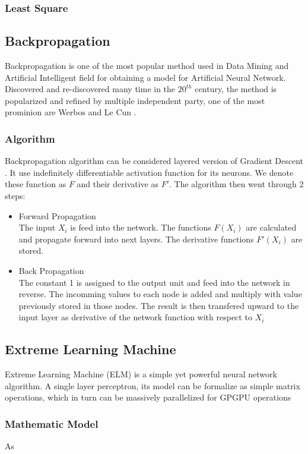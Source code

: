 \documentclass[11pt]{article}
\begin{document}
\subsubsection{Least Square}

\subsection{Backpropagation}
Backpropagation is one of the most popular method used in Data Mining and Artificial Intelligent field for obtaining a model for Artificial Neural Network. Discovered and re-discovered many time in the $20^{th}$ century, the method is popularized and refined by multiple independent party, one of the most prominion are Werbos and Le Cun \cite{lecun_theoretical_1992}.
\subsubsection{Algorithm}
Backpropagation algorithm can be considered layered version of Gradient Descent \cite{bishop_pattern_2006}. It use indefinitely differentiable activation function for its neurons. We denote these function as $F$ and their derivative as $F'$. The algorithm then went through 2 steps: \cite[161]{rojas_neural_1996}
\begin{itemize}
\item Forward Propagation\\
The input $X_i$ is feed into the network. The functions $F(X_i)$ are calculated and propagate forward into next layers. The derivative functions $F'(X_i)$ are stored.
\item Back Propagation\\
The constant 1 is assigned to the output unit and feed into the network in reverse. The incomming values to each node is added and multiply with value previously stored in those nodes. The result is then transfered upward to the input layer as derivative of the network function with respect to $X_i$
\end{itemize}
\subsection{Extreme Learning Machine}
Extreme Learning Machine (ELM) \cite{huang_extreme_2016} is a simple yet powerful neural network algorithm. A single layer perceptron, its model can be formalize as simple matrix operations, which in turn can be massively parallelized for GPGPU operations
\subsubsection{Mathematic Model}
As 
\end{document}
